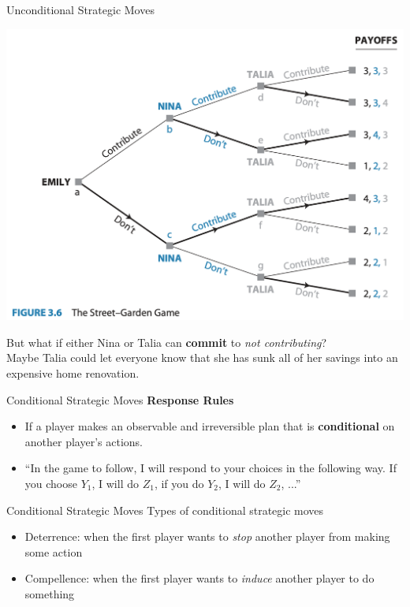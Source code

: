 
\begin{frame}{Unconditional Strategic Moves}
  \begin{center}
    \includegraphics[width=.6\textwidth]{figures/fig3.6.png}
  \end{center}
  But what if either \alert{Nina} or \alert{Talia} can 
  \textbf{commit} to \textit{not contributing}? \\ 
  Maybe \alert{Talia} could let everyone know that she has sunk all of her savings into an expensive home renovation.
\end{frame}


\begin{frame}{Conditional Strategic Moves}
  \textbf{\alert{Response Rules}} 
  \begin{itemize}
    \item If a player makes an observable and irreversible plan that is \textbf{conditional} on another player's actions. 
    \item ``In the game to follow, I will respond to your choices in the following way.
    If you choose $Y_1$, I will do $Z_1$, if you do $Y_2$, I will do $Z_2$, ...''
  \end{itemize}
\end{frame}


\begin{frame}{Conditional Strategic Moves}
  Types of conditional strategic moves
  \begin{itemize}
    \item \alert{Deterrence}: when the first player wants to \textit{stop} another player from making some action
    \item \alert{Compellence}: when the first player wants to \textit{induce} another player to do something 
  \end{itemize}
\end{frame}

